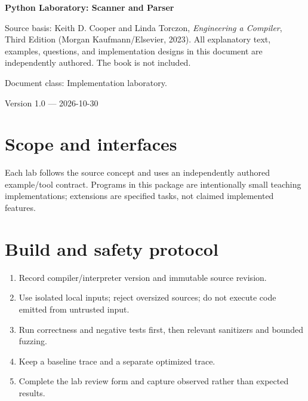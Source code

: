 \documentclass[10pt,letterpaper]{article}
\begin{document}
\begin{titlepage}
\centering\vspace*{1.0in}
{\Huge\bfseries\textcolor{CompilerBlue}{Python Laboratory: Scanner and Parser}\par}
\vspace{.22in}{\Large Executable reference kernels plus guided extensions\par}
\vspace{.4in}{\large Compiler Engineering Documentation Suite\par}
\vfill
\begin{minipage}{.86\linewidth}\small
Source basis: Keith D. Cooper and Linda Torczon, \emph{Engineering a Compiler}, Third Edition (Morgan Kaufmann/Elsevier, 2023). All explanatory text, examples, questions, and implementation designs in this document are independently authored. The book is not included.\par\medskip
Document class: Implementation laboratory.
\end{minipage}
\vfill\textcolor{CompilerGray}{Version 1.0 --- 2026-10-30}\par
\end{titlepage}
\tableofcontents\clearpage
\section{Scope and interfaces}
Each lab follows the source concept and uses an independently authored example/tool contract. Programs in this package are intentionally small teaching implementations; extensions are specified tasks, not claimed implemented features.

\section{Build and safety protocol}
\begin{enumerate}
\item Record compiler/interpreter version and immutable source revision.
\item Use isolated local inputs; reject oversized sources; do not execute code emitted from untrusted input.
\item Run correctness and negative tests first, then relevant sanitizers and bounded fuzzing.
\item Keep a baseline trace and a separate optimized trace.
\item Complete the lab review form and capture observed rather than expected results.
\end{enumerate}
\end{document}
